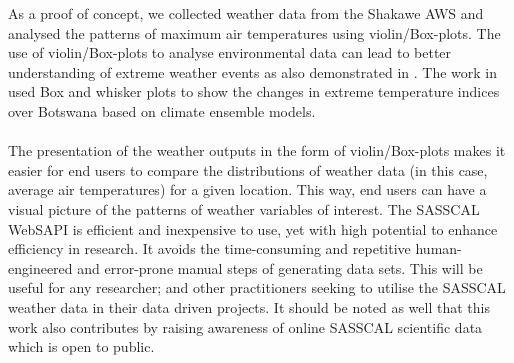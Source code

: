 \documentclass[a4paper, 10pt, conference]{ieeeconf}      %
\begin{document}
As a proof of concept, we collected weather data  from the Shakawe  AWS and  analysed the patterns of maximum air temperatures using  violin/Box-plots.
The use of  violin/Box-plots  to analyse environmental data can lead to better understanding of extreme weather events  as also demonstrated  in \cite{Nkemelang2018}. The  work in \cite{Nkemelang2018}
used Box and whisker plots to show the changes in extreme temperature indices   over Botswana based on climate ensemble models.\\
\\
The presentation of the weather outputs  in the form of  violin/Box-plots makes it easier for end users to compare the distributions  of weather data (in this case, average air temperatures) for a given location. This way, end users can have a visual picture of the patterns of weather variables of interest. 
The SASSCAL WebSAPI is  efficient and inexpensive to use, yet with high potential to enhance efficiency in research.
It avoids the time-consuming and repetitive human-engineered and error-prone manual steps of generating data sets.  
This  will be  useful for any researcher; and other practitioners seeking to utilise the SASSCAL weather data in their data driven   projects.
It should be noted as well that this work also contributes by  raising awareness of online SASSCAL scientific data which is open to public. 
\end{document}
